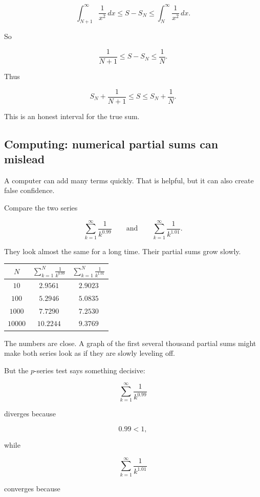 \[
\int_{N+1}^{\infty}\frac1{x^2}\,dx
\le
S-S_N
\le
\int_N^{\infty}\frac1{x^2}\,dx.
\]

So

\[
\frac1{N+1}
\le
S-S_N
\le
\frac1N.
\]

Thus

\[
S_N+\frac1{N+1}
\le
S
\le
S_N+\frac1N.
\]

This is an honest interval for the true sum.

\subsection{Computing: numerical partial sums can mislead}
\label{subsec:computing-partial-sums-can-mislead}

A computer can add many terms quickly.  That is helpful, but it can also create false
confidence.

Compare the two series

\[
\sum_{k=1}^{\infty}\frac1{k^{0.99}}
\qquad\text{and}\qquad
\sum_{k=1}^{\infty}\frac1{k^{1.01}}.
\]

They look almost the same for a long time.  Their partial sums grow slowly.

\begin{center}
\begin{tabular}{c|c|c}
\textbf{\(N\)} &
\(\displaystyle \sum_{k=1}^{N}\frac1{k^{0.99}}\) &
\(\displaystyle \sum_{k=1}^{N}\frac1{k^{1.01}}\) \\ \hline
\(10\) & \(2.9561\) & \(2.9023\) \\
\(100\) & \(5.2946\) & \(5.0835\) \\
\(1000\) & \(7.7290\) & \(7.2530\) \\
\(10000\) & \(10.2244\) & \(9.3769\)
\end{tabular}
\end{center}

The numbers are close.  A graph of the first several thousand partial sums might make
both series look as if they are slowly leveling off.

But the \(p\)-series test says something decisive:

\[
\sum_{k=1}^{\infty}\frac1{k^{0.99}}
\]

diverges because

\[
0.99<1,
\]

while

\[
\sum_{k=1}^{\infty}\frac1{k^{1.01}}
\]

converges because

